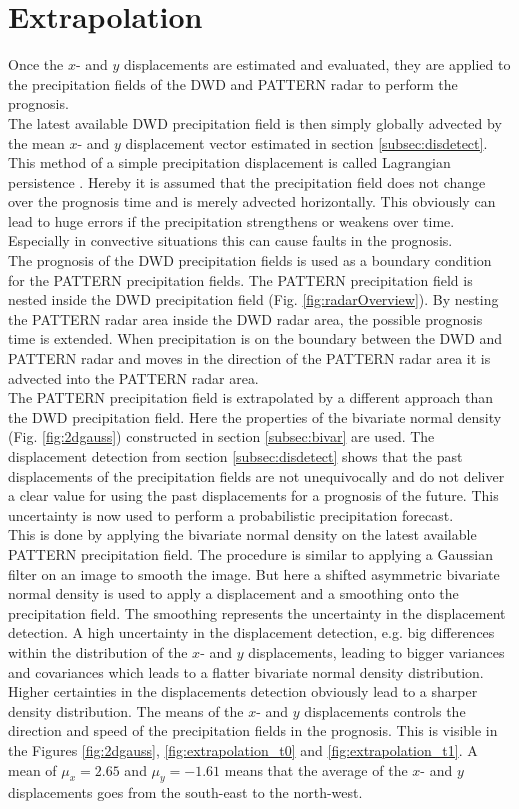 \documentclass[11pt,twoside,a4paper,fleqn,x11names]{report}
\numberwithin{equation}{chapter}
\numberwithin{figure}{chapter}
\numberwithin{table}{chapter}
\begin{document}
\section{Extrapolation}
\label{subsec:extrapolation}
Once the $x$- and $y$ displacements are estimated and evaluated, they are applied to the precipitation fields of the DWD and PATTERN radar to perform the prognosis. \\
The latest available DWD precipitation field is then simply globally advected by the mean $x$- and $y$ displacement vector estimated in section \ref{subsec:disdetect}. This method of a simple precipitation displacement is called Lagrangian persistence \citep{Germann}. Hereby it is assumed that the precipitation field does not change over the prognosis time and is merely advected horizontally. This obviously can lead to huge errors if the precipitation strengthens or weakens over time. Especially in convective situations this can cause faults in the prognosis. \\
The prognosis of the DWD precipitation fields is used as a boundary condition for the PATTERN precipitation fields. The PATTERN precipitation field is nested inside the DWD precipitation field (Fig. \ref{fig:radarOverview}). By nesting the PATTERN radar area inside the DWD radar area, the possible prognosis time is extended. When precipitation is on the boundary between the DWD and PATTERN radar and moves in the direction of the PATTERN radar area it is advected into the PATTERN radar area.\\
The PATTERN precipitation field is extrapolated by a different approach than the DWD precipitation field. Here the properties of the bivariate normal density (Fig. \ref{fig:2dgauss}) constructed in section \ref{subsec:bivar} are used. The displacement detection from section \ref{subsec:disdetect} shows that the past displacements of the precipitation fields are not unequivocally and do not deliver a clear value for using the past displacements for a prognosis of the future. This uncertainty is now used to perform a probabilistic precipitation forecast. \\
This is done by applying the bivariate normal density on the latest available PATTERN precipitation field. The procedure is similar to applying a Gaussian filter on an image to smooth the image. But here a shifted asymmetric bivariate normal density is used to apply a displacement and a smoothing onto the precipitation field. The smoothing represents the uncertainty in the displacement detection. A high uncertainty in the displacement detection, e.g. big differences within the distribution of the $x$- and $y$ displacements, leading to bigger variances and covariances which leads to a flatter bivariate normal density distribution. Higher certainties in the displacements detection obviously lead to a sharper density distribution. The means of the $x$- and $y$ displacements controls the direction and speed of the precipitation fields in the prognosis. This is visible in the Figures \ref{fig:2dgauss}, \ref{fig:extrapolation_t0} and \ref{fig:extrapolation_t1}. A mean of $\mu_x=2.65$ and $\mu_y=-1.61$ means that the average of the $x$- and $y$ displacements goes from the south-east to the north-west.\\
\end{document}
